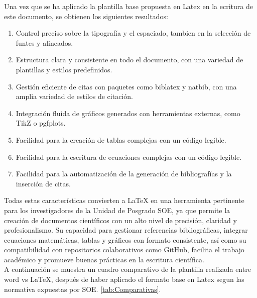 \documentclass[10pt]{article}
\begin{document}
Una vez que se ha aplicado la plantilla base propuesta en Latex en la ecritura de este documento, se obtienen los siguientes resultados:
    \begin{enumerate}
        \item Control preciso sobre la tipografía y el espaciado, tambien en la selección de funtes y alineados.
        \item Estructura clara y consistente en todo el documento, con una variedad de plantillas y estilos predefinidos.
        \item Gestión eficiente de citas con paquetes como biblatex y natbib, con una amplia variedad de estilos de citación.
        \item Integración fluida de gráficos generados con herramientas externas, como TikZ o pgfplots.
        \item Facilidad para la creación de tablas complejas con un código legible.
        \item Facilidad para la escritura de ecuaciones complejas con un código legible.
        \item Facilidad para la automatización de la generación de bibliografías y la inserción de citas.
    \end{enumerate}
    Todas estas características convierten a LaTeX en una herramienta pertinente para los investigadores de la Unidad de Posgrado SOE, ya que permite la creación de documentos científicos con un alto nivel de precisión, claridad y profesionalismo. 
    Su capacidad para gestionar referencias bibliográficas, integrar ecuaciones matemáticas, tablas y gráficos con formato consistente, así como su compatibilidad con repositorios colaborativos como GitHub, facilita el trabajo académico y promueve buenas prácticas en la escritura científica.\\
    A continuación se muestra un cuadro comparativo de la plantilla realizada entre word vs LaTeX, después de haber aplicado el formato base en Latex segun las normativa expuestas por SOE.  \ref{tab:Comparativas}.
\end{document}
